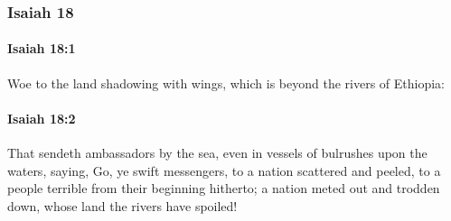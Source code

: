 	\subsubsection{Isaiah 18} %
		\label{ISAIAH-18}

		\paragraph{Isaiah 18:1} %
			\label{ISAIAH-18-1}

			Woe to the land shadowing with wings, which is beyond the rivers of Ethiopia:


		\paragraph{Isaiah 18:2} %
			\label{ISAIAH-18-2}

			That sendeth ambassadors by the sea, even in vessels of bulrushes upon the waters, saying, Go, ye swift messengers, to a nation scattered and peeled, to a people terrible from their beginning hitherto; a nation meted out and trodden down, whose land the rivers have spoiled!

